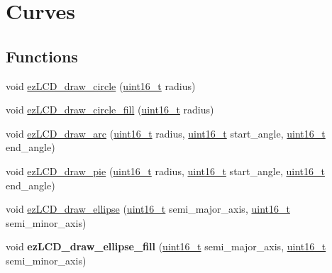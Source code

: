 \hypertarget{group__ez_l_c_d__103__curves}{\section{Curves}
\label{group__ez_l_c_d__103__curves}
}
\subsection*{Functions}
\begin{DoxyCompactItemize}
\item 
void \hyperlink{group__ez_l_c_d__103__curves_gae7eccb7a5b90a8f2e278cfaa882f44da}{ez\-L\-C\-D\-\_\-draw\-\_\-circle} (\hyperlink{group__ez_l_c_d__103__common_ga1f1825b69244eb3ad2c7165ddc99c956}{uint16\-\_\-t} radius)
\item 
void \hyperlink{group__ez_l_c_d__103__curves_ga5ab95b72aeeba1b9b868d7d67a2376cb}{ez\-L\-C\-D\-\_\-draw\-\_\-circle\-\_\-fill} (\hyperlink{group__ez_l_c_d__103__common_ga1f1825b69244eb3ad2c7165ddc99c956}{uint16\-\_\-t} radius)
\item 
void \hyperlink{group__ez_l_c_d__103__curves_ga56693f8b1934498767a35d5f4bf60cca}{ez\-L\-C\-D\-\_\-draw\-\_\-arc} (\hyperlink{group__ez_l_c_d__103__common_ga1f1825b69244eb3ad2c7165ddc99c956}{uint16\-\_\-t} radius, \hyperlink{group__ez_l_c_d__103__common_ga1f1825b69244eb3ad2c7165ddc99c956}{uint16\-\_\-t} start\-\_\-angle, \hyperlink{group__ez_l_c_d__103__common_ga1f1825b69244eb3ad2c7165ddc99c956}{uint16\-\_\-t} end\-\_\-angle)
\item 
void \hyperlink{group__ez_l_c_d__103__curves_ga1b88757cfde8330eeac7d398e0e0b0e9}{ez\-L\-C\-D\-\_\-draw\-\_\-pie} (\hyperlink{group__ez_l_c_d__103__common_ga1f1825b69244eb3ad2c7165ddc99c956}{uint16\-\_\-t} radius, \hyperlink{group__ez_l_c_d__103__common_ga1f1825b69244eb3ad2c7165ddc99c956}{uint16\-\_\-t} start\-\_\-angle, \hyperlink{group__ez_l_c_d__103__common_ga1f1825b69244eb3ad2c7165ddc99c956}{uint16\-\_\-t} end\-\_\-angle)
\item 
void \hyperlink{group__ez_l_c_d__103__curves_ga22836e0b216c7a297b155942008c3070}{ez\-L\-C\-D\-\_\-draw\-\_\-ellipse} (\hyperlink{group__ez_l_c_d__103__common_ga1f1825b69244eb3ad2c7165ddc99c956}{uint16\-\_\-t} semi\-\_\-major\-\_\-axis, \hyperlink{group__ez_l_c_d__103__common_ga1f1825b69244eb3ad2c7165ddc99c956}{uint16\-\_\-t} semi\-\_\-minor\-\_\-axis)
\item 
\hypertarget{group__ez_l_c_d__103__curves_ga5fbe471b5f2182b9b5ca406aad3bfb21}{void {\bfseries ez\-L\-C\-D\-\_\-draw\-\_\-ellipse\-\_\-fill} (\hyperlink{group__ez_l_c_d__103__common_ga1f1825b69244eb3ad2c7165ddc99c956}{uint16\-\_\-t} semi\-\_\-major\-\_\-axis, \hyperlink{group__ez_l_c_d__103__common_ga1f1825b69244eb3ad2c7165ddc99c956}{uint16\-\_\-t} semi\-\_\-minor\-\_\-axis)}\label{group__ez_l_c_d__103__curves_ga5fbe471b5f2182b9b5ca406aad3bfb21}


\end{DoxyCompactItemize}
